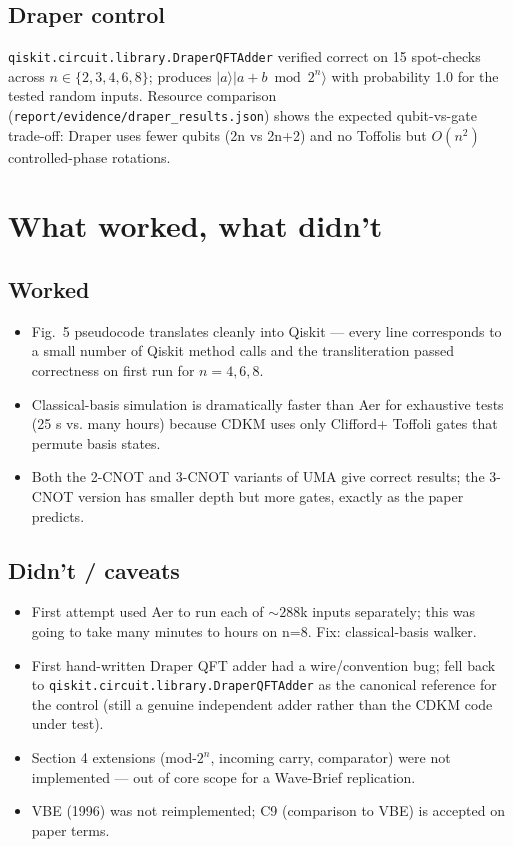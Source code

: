 \documentclass[11pt]{article}
\begin{document}
\subsection{Draper control}
\texttt{qiskit.circuit.library.DraperQFTAdder} verified correct on 15 spot-checks
across $n\in\{2,3,4,6,8\}$; produces $|a\rangle|a+b\bmod 2^n\rangle$ with
probability 1.0 for the tested random inputs. Resource comparison
(\texttt{report/evidence/draper\_results.json}) shows the expected
qubit-vs-gate trade-off: Draper uses fewer qubits (2n vs 2n+2) and no Toffolis
but $O(n^2)$ controlled-phase rotations.

\section{What worked, what didn't}

\subsection{Worked}
\begin{itemize}
    \item Fig.~5 pseudocode translates cleanly into Qiskit --- every line
      corresponds to a small number of Qiskit method calls and the
      transliteration passed correctness on first run for $n=4,6,8$.
    \item Classical-basis simulation is dramatically faster than Aer for
      exhaustive tests (25 s vs. many hours) because CDKM uses only Clifford+
      Toffoli gates that permute basis states.
    \item Both the 2-CNOT and 3-CNOT variants of UMA give correct results;
      the 3-CNOT version has smaller depth but more gates, exactly as the
      paper predicts.
\end{itemize}

\subsection{Didn't / caveats}
\begin{itemize}
    \item First attempt used Aer to run each of $\sim 288$k inputs
      separately; this was going to take many minutes to hours on n=8. Fix:
      classical-basis walker.
    \item First hand-written Draper QFT adder had a wire/convention bug; fell
      back to \texttt{qiskit.circuit.library.DraperQFTAdder} as the canonical
      reference for the control (still a genuine independent adder rather
      than the CDKM code under test).
    \item Section 4 extensions (mod-$2^n$, incoming carry, comparator) were
      not implemented --- out of core scope for a Wave-Brief replication.
    \item VBE (1996) was not reimplemented; C9 (comparison to VBE) is
      accepted on paper terms.
\end{itemize}
\end{document}
